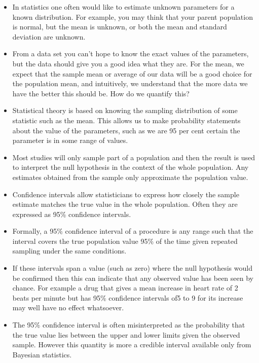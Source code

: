 \begin{itemize}
\item In statistics one often would like to estimate unknown parameters for a known distribution. For example, you may think that your parent population is normal, but the mean is unknown, or both the mean and standard deviation are unknown. 
\item From a data set you can't hope to know the exact values of the parameters, but the data should give you a good idea what they are. For the mean, we expect that the sample mean or average of our data will be a good choice for the population mean, and intuitively, we understand that the more data we have the better this should be. How do we quantify this?

\item Statistical theory is based on knowing the sampling distribution of some statistic such as the mean. This allows us to make probability statements about the value of the parameters, such as we are 95 per cent certain the parameter is in some range of values.
\item Most studies will only sample part of a population and then the result is used to interpret the null hypothesis in the context of the whole population. Any estimates obtained from the sample only approximate the population value. 
\item Confidence intervals allow statisticians to express how closely the sample estimate matches the true value in the whole population. Often they are expressed as 95\% confidence intervals. 
\item Formally, a 95\% confidence interval of a procedure is any range such that the interval covers the true population value 95\% of the time given repeated sampling under the same conditions.

\item If these intervals span a value (such as zero) where the null hypothesis would be confirmed then this can indicate that any observed value has been seen by chance. For example a drug that gives a mean increase in heart rate of 2 beats per minute but has 95\% confidence intervals of5 to 9 for its increase may well have no effect whatsoever.

\item The 95\% confidence interval is often misinterpreted as the probability that the true value lies between the upper and lower limits given the observed sample. However this quantity is more a credible interval available only from Bayesian statistics.

\end{itemize}
\medskip

